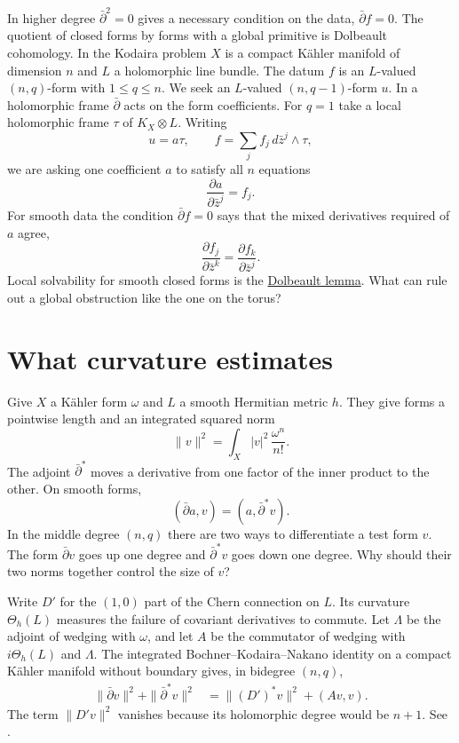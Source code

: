 In higher degree $\bar\partial^2=0$
gives a necessary condition on the data,
$\bar\partial f=0$. The quotient of
closed forms by forms with a global
primitive is Dolbeault cohomology.
In the Kodaira problem $X$ is a compact
K\"ahler manifold of dimension $n$ and
$L$ a holomorphic line bundle. The datum
$f$ is an $L$-valued $(n,q)$-form with
$1\le q\le n$. We seek an $L$-valued
$(n,q-1)$-form $u$. In a holomorphic
frame $\bar\partial$ acts on the form
coefficients. For $q=1$ take a local
holomorphic frame $\tau$ of $K_X\otimes L$.
Writing
$$
u=a\tau,\qquad
f=\sum_j f_j\,d\bar z^j\wedge\tau,
$$
we are asking one coefficient $a$ to
satisfy all $n$ equations
$$
\frac{\partial a}{\partial\bar z^j}=f_j.
$$
For smooth data the condition
$\bar\partial f=0$ says that the mixed
derivatives required of $a$ agree,
$$
\frac{\partial f_j}{\partial\bar z^k}
=\frac{\partial f_k}{\partial\bar z^j}.
$$
Local solvability for smooth closed forms
is the
\href{https://www.heap-project.org/tag/08QG}
{Dolbeault lemma}. What can rule out a
global obstruction like the one on the
torus?

\section{What curvature estimates}
\label{section-dbar-curvature}

Give $X$ a K\"ahler form $\omega$ and $L$
a smooth Hermitian metric $h$. They give
forms a pointwise length and an integrated
squared norm
$$
\|v\|^2=\int_X |v|^2\,\frac{\omega^n}{n!}.
$$
The adjoint $\bar\partial^*$ moves a
derivative from one factor of the inner
product to the other. On smooth forms,
$$
(\bar\partial a,v)=(a,\bar\partial^*v).
$$
In the middle degree $(n,q)$ there are
two ways to differentiate a test form $v$.
The form $\bar\partial v$ goes up one
degree and $\bar\partial^*v$ goes down
one degree. Why should their two norms
together control the size of $v$?

Write $D'$ for the $(1,0)$ part of the
Chern connection on $L$. Its curvature
$\Theta_h(L)$ measures the failure of
covariant derivatives to commute.
Let $\Lambda$ be the adjoint of wedging
with $\omega$, and let $A$ be the
commutator of wedging with $i\Theta_h(L)$
and $\Lambda$. The integrated
Bochner--Kodaira--Nakano identity on a
compact K\"ahler manifold without boundary
gives, in bidegree $(n,q)$,
$$
\begin{aligned}
\|\bar\partial v\|^2+\|\bar\partial^*v\|^2
&=\|(D')^*v\|^2+(Av,v).
\end{aligned}
$$
The term $\|D'v\|^2$ vanishes because
its holomorphic degree would be $n+1$.
See \cite[Section 4, (4.7) and (4.10)]%
{demailly-cime}.

